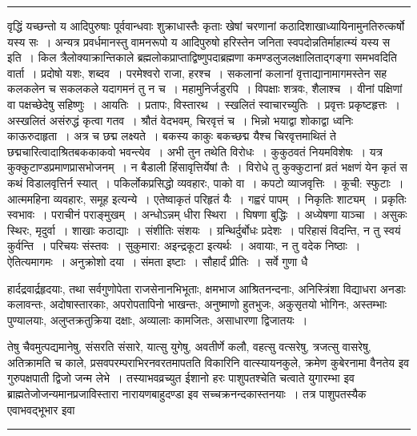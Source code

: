 \documentclass[11pt, openany]{book}
\begin{document}
\vspace{2mm}
\hrule

\noindent
{\s वृद्धिं यच्छन्तो य आदिपुरुषाः पूर्ववान्धवाः शुक्राधास्तैः कृताः खेषां चरणानां कठादिशाखाध्यायिनामुनतिरुत्कर्षो यस्य सः~। अन्यत्र प्रवर्धमानस्तु वामनरूपो य आदिपुरुषो हरिस्तेन जनिता स्वपदोन्नतिर्माहात्म्यं यस्य स इति~। किल त्रैलोक्याक्रान्तिकाले ब्रह्मलोकप्राप्ताद्विष्णुपदाब्रह्मणा कमण्डलुजलक्षालिताद्गङ्गा समभवदिति वार्ता~। प्रदोषो यशः, शब्दव~। परमेश्वरो राजा, हरश्च~। सकलानां कलानां वृत्ताद्यानामागमस्तेन सह कलकलेन च सकलकले यदागमनं तु न च~। महामुनिर्जडुरपि~। विपक्षाः शत्रवः, शैलाश्च~। वीनां पक्षिणां वा पक्षच्छेदेषु सहिष्णुः~। आयतिः~। प्रतापः, विस्तारथ~। स्खलितं स्वाचारच्युतिः~। प्रवृत्तः प्रकृष्टहृत्तः~। अस्खलितं असंरुद्धं कृत्वा गतव~। श्रौतं वेदभवम्, चिरवृत्तं च~। {\qt भिन्नो भयाद्वा शोकाद्वा ध्वनिः काऊरुदाहृता}~। अत्र च छद्म लक्ष्यते~। बकस्य काकुः बकच्छद्म यैश्च चिरवृत्तमाथितं ते छद्मचारित्वादाश्रितबककाकवो भवन्त्येव~। अभी तुन तथेति विरोधः~। कुकुठवतं नियमविशेषः~। यत्र कुक्कुटाण्डप्रमाणप्रासभोजनम्~। न बैडाली हिंसावृत्तिर्येषां तैः~। विरोधे तु कुक्कुटानां व्रतं भक्षणं येन कृतं स कथं विडालवृत्तिर्न स्यात्~। पकिर्लोकप्रसिद्धो व्यवहारः, पाको वा~। कपटो व्याजवृत्तिः~। कूची: स्फुटाः~। आत्ममहिना व्यवहारः, समूह इत्यन्ये~। एतेष्वाकृतं परिहृतं यैः~। गह्वरं पापम्~। निकृतिः शाट्यम्~। प्रकृतिः स्वभावः~। पराचीनं पराङ्मुखम्~। अन्धोऽन्नम् धीरा स्थिरा~। घिषणा बुद्धिः~। अध्येषणा याञ्चा~। असुकः स्थिरः, मृदुर्वा~। शाखाः कठाद्याः~। संशीतिः संशयः~। ग्रन्थिर्दुर्बोधः प्रदेशः~। परिहासं विदन्ति, न तु स्वयं कुर्वन्ति~। परिचयः संस्तवः~। सुकुमारा: अइन्द्रकूटा इत्यर्थः~। अवायाः, न तु वदेक निष्ठाः~। ऐतित्यमागमः~। अनुक्रोशो दया~। संमता इष्टाः~। सौहार्दं प्रीतिः~। सर्वे गुणा धै\textendash}

\newpage

\noindent
हार्दद्रवार्द्रहृदयाः, तथा सर्वगुणोपेता राजसेनानभिभूताः, क्षमभाज आश्रितनन्दनाः, अनिस्त्रिंशा विद्याधरा अनडाः कलावन्तः, अदोषास्तारकाः, अपरोपतापिनो भाखन्तः, अनुष्माणो हुतभुजः, अकुसृतयो भोगिनः, अस्तम्भाः पुण्यालयाः, अलुप्तक्रतुक्रिया दक्षाः, अव्यालाः कामजितः, असाधारणा द्विजातयः~।

तेषु चैवमुत्पद्यमानेषु, संसरति संसारे, यात्सु युगेषु, अवतीर्णे कलौ, वहत्सु वत्सरेषु, त्रजत्सु वासरेषु, अतिक्रामति च काले, प्रसवपरम्पराभिरनवरतमापतति विकारिनि वात्स्यायनकुले, क्रमेण कुबेरनामा वैनतेय इव गुरुपक्षपाती द्विजो जन्म लेभे~। तस्याभवव्रच्युत ईशानो हरः पाशुपतश्चेति चत्वाते युगारम्भा इव ब्राह्मतेजोजन्यमानप्रजाविस्तारा नारायणबाहुदण्डा इव सच्चक्रनन्दकास्तनयाः~। तत्र पाशुपतस्यैक एवाभवद्भूभार इवा\textendash

\vspace{2mm}
\hrule
\end{document}
